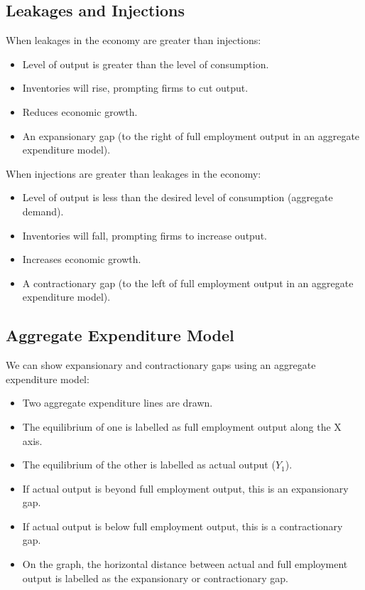 \documentclass[a4paper,11pt]{article}
\begin{document}
\subsection{Leakages and Injections}

When leakages in the economy are greater than injections:

\begin{itemize}
\item Level of output is greater than the level of consumption.
\item Inventories will rise, prompting firms to cut output.
\item Reduces economic growth.
\item An expansionary gap (to the right of full employment output in an
	aggregate expenditure model).
\end{itemize}

When injections are greater than leakages in the economy:

\begin{itemize}
\item Level of output is less than the desired level of consumption (aggregate
	demand).
\item Inventories will fall, prompting firms to increase output.
\item Increases economic growth.
\item A contractionary gap (to the left of full employment output in an
	aggregate expenditure model).
\end{itemize}


\subsection{Aggregate Expenditure Model}


We can show expansionary and contractionary gaps using an aggregate expenditure
model:

\begin{itemize}
\item Two aggregate expenditure lines are drawn.
\item The equilibrium of one is labelled as full employment output along the X
	axis.
\item The equilibrium of the other is labelled as actual output ($Y_1$).
\item If actual output is beyond full employment output, this is an expansionary
	gap.
\item If actual output is below full employment output, this is a contractionary
	gap.
\item On the graph, the horizontal distance between actual and full employment
	output is labelled as the expansionary or contractionary gap.
\end{itemize}
\end{document}
